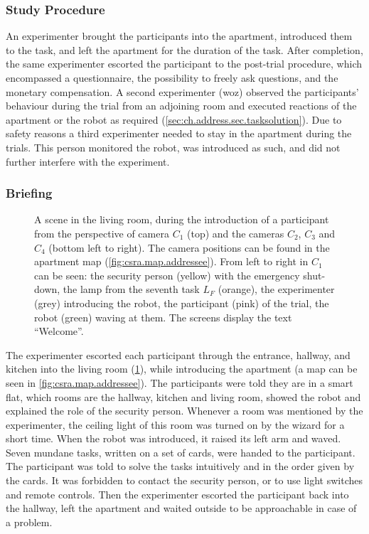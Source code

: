 \subsubsection{Study Procedure}

An experimenter brought the participants into the \gls{apartment}, introduced them to the task, and left the \gls{apartment} for the duration of the task.
After completion, the same experimenter escorted the participant to the post-trial procedure, which encompassed a questionnaire, the possibility to freely ask questions, and the monetary compensation.
A second experimenter (\gls{woz}) observed the participants' behaviour during the trial from an adjoining room and executed reactions of the \gls{apartment} or the \gls{robot} as required (\cref{sec:ch.address.sec.tasksolution}).
Due to safety reasons a third experimenter needed to stay in the \gls{apartment} during the trials.
This person monitored the \gls{robot}, was introduced as such, and did not further interfere with the experiment.

\subsubsection{Briefing}

\begin{figure}[tbh!]
    \centering
    \def\svgwidth{1.0\textwidth}
    
    \caption[Addressing apartment study cameras.]{\label{fig:study.addressee.views} 
    A scene in the living room, during the introduction of a participant from the perspective of camera \(C_1\) (top) and the cameras \(C_2\), \(C_3\) and \(C_4\) (bottom left to right). 
    The camera positions can be found in the \gls{apartment} map (\cref{fig:csra.map.addressee}).
    From left to right in \(C_1\) can be seen: the security person (yellow) with the emergency shut-down, the lamp from the seventh task \(L_F\) (orange), the experimenter (grey) introducing the \gls{robot}, the participant (pink) of the trial, the \gls{robot} (green) waving at them. 
    The screens display the text \enquote{Welcome}.
    }
\end{figure}

The experimenter escorted each participant through the entrance, hallway, and kitchen into the living room (\cref{fig:study.addressee.views}), while introducing the \gls{apartment} (a map can be seen in \cref{fig:csra.map.addressee}).
The participants were told they are in a smart flat, which rooms are the hallway, kitchen and living room, showed the \gls{robot} and explained the role of the security person.
Whenever a room was mentioned by the experimenter, the ceiling light of this room was turned on by the \gls{wizard} for a short time.
When the \gls{robot} was introduced, it raised its left arm and waved.
Seven mundane tasks, written on a set of cards, were handed to the participant.
The participant was told to solve the tasks intuitively and in the order given by the cards.
It was forbidden to contact the security person, or to use light switches and remote controls.
Then the experimenter escorted the participant back into the hallway, left the \gls{apartment} and waited outside to be approachable in case of a problem. 

